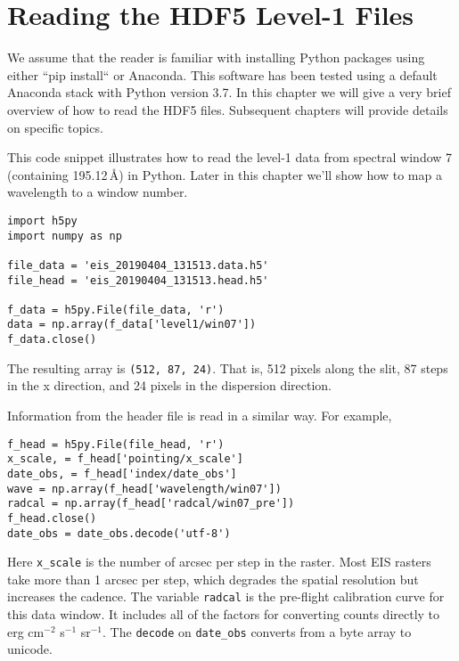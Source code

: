 
\chapter{Reading the HDF5 Level-1 Files}

We assume that the reader is familiar with installing Python packages using either ``pip
install`` or Anaconda. This software has been tested using a default Anaconda stack with Python
version 3.7. In this chapter we will give a very brief overview of how to read the HDF5
files. Subsequent chapters will provide details on specific topics.

This code snippet illustrates how to read the level-1 data from spectral window 7 (containing
 195.12\,\AA) in Python. Later in this chapter we'll show how to map a wavelength to a
window number.

\begin{lstlisting}
import h5py
import numpy as np

file_data = 'eis_20190404_131513.data.h5'
file_head = 'eis_20190404_131513.head.h5'

f_data = h5py.File(file_data, 'r')
data = np.array(f_data['level1/win07'])
f_data.close()
\end{lstlisting}
The resulting array is \verb+(512, 87, 24)+. That is, 512 pixels along the slit, 87 steps in the x
direction, and 24 pixels in the dispersion direction.

Information from the header file is read in a similar way. For example,
\begin{lstlisting}
f_head = h5py.File(file_head, 'r')
x_scale, = f_head['pointing/x_scale']
date_obs, = f_head['index/date_obs']
wave = np.array(f_head['wavelength/win07'])
radcal = np.array(f_head['radcal/win07_pre'])
f_head.close()
date_obs = date_obs.decode('utf-8')
\end{lstlisting}
Here \verb+x_scale+ is the number of arcsec per step in the raster. Most EIS rasters take more than
1 arcsec per step, which degrades the spatial resolution but increases the cadence. The variable
\verb+radcal+ is the pre-flight calibration curve for this data window. It includes all of the
factors for converting counts directly to erg cm$^{-2}$ s$^{-1}$ sr$^{-1}$. The \verb+decode+ on
\verb+date_obs+ converts from a byte array to unicode.

